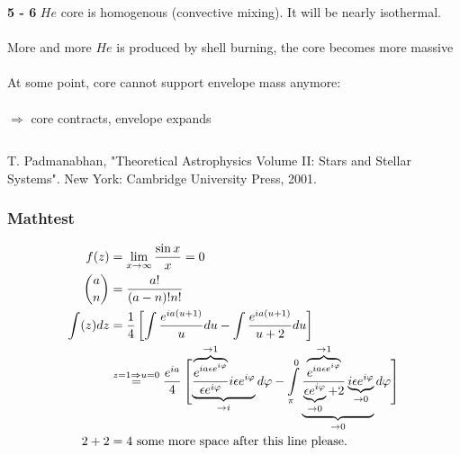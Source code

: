 









\begin{frame}
	\begin{columns}
		\begin{block}{\textbf{5 - 6 }}
			$He$ core is homogenous (convective mixing). It will be nearly isothermal.\\~\\
			
			More and more $He$ is produced by shell burning, the core becomes more massive \\~\\			
			
			At some point, core cannot support envelope mass anymore: \\~\\
			
			
			$\Rightarrow$ core contracts, envelope expands
		\end{block}
		\vspace{.77cm}
	\end{columns}	
	\begin{center}
		\fillframe
		\setlength{\baselineskip}{0pt}
		{\tiny
			T. Padmanabhan, "Theoretical Astrophysics Volume II: Stars and Stellar Systems". New York: Cambridge University Press, 2001.
		}
	\end{center}
\end{frame}












\begin{frame}
	\frametitle{Mathtest}
	\begin{align}
			 f(z) &= \lim\limits_{x\rightarrow \infty} \frac{\sin x}{x} = 0\\
		 	 \binom{a}{n} &= \frac{a!}{(a-n)! n!}\\
		 	 \nonumber \int(z) dz &=  \frac14 \left[ \int\frac{e^{ia(u + 1)}}{u} du - \int\frac{e^{ia(u + 1)}}{u + 2}du   \right]\\[1em]
		 	 & \overset{z = 1 \Rightarrow u = 0}=  \frac{e^{i a}}{4} \left[\vphantom{ \int\limits_{\pi}^0} \smash{ \underbrace{\frac{\overbrace{e^{ia \epsilon e^{i \varphi}}}^{\rightarrow 1}} {\epsilon e^{i \varphi}} i \epsilon e^{i \varphi}}_{\rightarrow i}  d \varphi            - \int\limits_{\pi}^0 \underbrace{\frac{\overbrace{e^{ia \epsilon e^{i \varphi}}}^{\rightarrow 1}} {\underbrace{\epsilon e^{i \varphi}}_{\rightarrow 0} + 2} \underbrace{i \epsilon e^{i \varphi}}_{\rightarrow 0}}_{\rightarrow 0}  d \varphi  }\right]\\[2em]
		 	 2 + 2 &= 4 \ \text{some more space after this line please.}\\[4em]\nonumber
	\end{align}
\end{frame}




